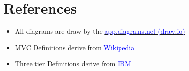\section{References}

\begin{itemize}
    \item All diagrams are draw by the \href{https://app.diagrams.net/} {\textcolor{blue} {app.diagrams.net (draw.io)}}
    \item MVC Definitions derive from
    \href{https://en.wikipedia.org/wiki/Model\%E2\%80\%93view\%E2\%80\%93controller} {\textcolor{blue} {Wikipedia}}
    \item Three tier Definitions derive from \href{https://www.ibm.com/cloud/learn/three-tier-architecture} {\textcolor{blue} {IBM}}
\end{itemize}